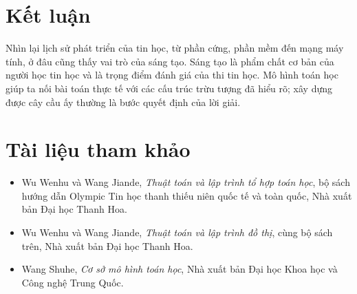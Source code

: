 \documentclass[11pt]{article}
\begin{document}
\section{Kết luận}

Nhìn lại lịch sử phát triển của tin học, từ phần cứng, phần mềm đến mạng máy
tính, ở đâu cũng thấy vai trò của sáng tạo. Sáng tạo là phẩm chất cơ bản của
người học tin học và là trọng điểm đánh giá của thi tin học. Mô hình toán học
giúp ta nối bài toán thực tế với các cấu trúc trừu tượng đã hiểu rõ; xây dựng
được cây cầu ấy thường là bước quyết định của lời giải.

\section*{Tài liệu tham khảo}

\begin{itemize}
  \item Wu Wenhu và Wang Jiande, \textit{Thuật toán và lập trình tổ hợp toán
  học}, bộ sách hướng dẫn Olympic Tin học thanh thiếu niên quốc tế và toàn
  quốc, Nhà xuất bản Đại học Thanh Hoa.
  \item Wu Wenhu và Wang Jiande, \textit{Thuật toán và lập trình đồ thị}, cùng
  bộ sách trên, Nhà xuất bản Đại học Thanh Hoa.
  \item Wang Shuhe, \textit{Cơ sở mô hình toán học}, Nhà xuất bản Đại học Khoa
  học và Công nghệ Trung Quốc.
\end{itemize}
\end{document}
